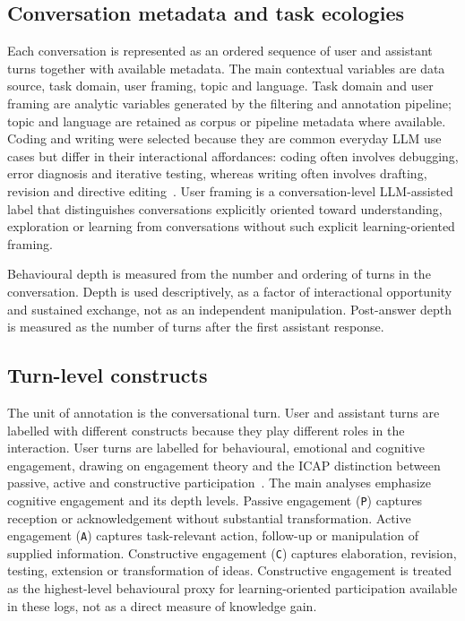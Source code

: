 \subsection{Conversation metadata and task ecologies}

Each conversation is represented as an ordered sequence of user and assistant turns together with available metadata. The main contextual variables are data source, task domain, user framing, topic and language. Task domain and user framing are analytic variables generated by the filtering and annotation pipeline; topic and language are retained as corpus or pipeline metadata where available. Coding and writing were selected because they are common everyday LLM use cases but differ in their interactional affordances: coding often involves debugging, error diagnosis and iterative testing, whereas writing often involves drafting, revision and directive editing~\cite{keuning2018systematic,flower1981cognitive,sommers1980revision}. User framing is a conversation-level LLM-assisted label that distinguishes conversations explicitly oriented toward understanding, exploration or learning from conversations without such explicit learning-oriented framing.

Behavioural depth is measured from the number and ordering of turns in the conversation. Depth is used descriptively, as a factor of interactional opportunity and sustained exchange, not as an independent manipulation. Post-answer depth is measured as the number of turns after the first assistant response.

\subsection{Turn-level constructs}

The unit of annotation is the conversational turn. User and assistant turns are labelled with different constructs because they play different roles in the interaction. User turns are labelled for behavioural, emotional and cognitive engagement, drawing on engagement theory and the ICAP distinction between passive, active and constructive participation~\cite{fredricks2004school,chi2014icap}. The main analyses emphasize cognitive engagement and its depth levels. Passive engagement (\texttt{P}) captures reception or acknowledgement without substantial transformation. Active engagement (\texttt{A}) captures task-relevant action, follow-up or manipulation of supplied information. Constructive engagement (\texttt{C}) captures elaboration, revision, testing, extension or transformation of ideas. Constructive engagement is treated as the highest-level behavioural proxy for learning-oriented participation available in these logs, not as a direct measure of knowledge gain.

